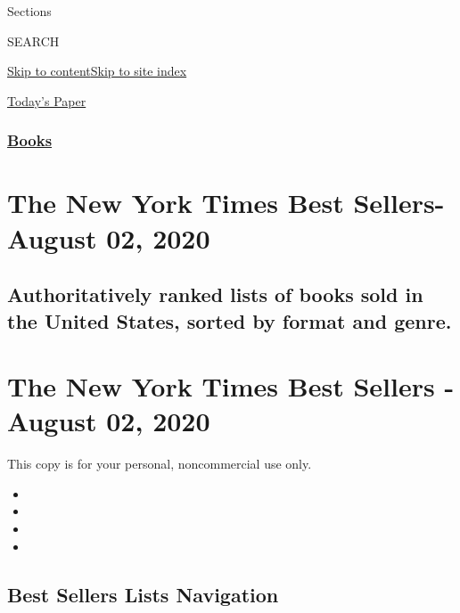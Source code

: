 Sections

SEARCH

\protect\hyperlink{site-content}{Skip to
content}\protect\hyperlink{site-index}{Skip to site index}

\href{https://myaccount.nytimes3xbfgragh.onion/auth/login?response_type=cookie\&client_id=vi}{}

\href{https://www.nytimes3xbfgragh.onion/section/todayspaper}{Today's
Paper}

\hypertarget{books}{%
\subsubsection{\texorpdfstring{\href{/section/books/}{Books}}{Books}}\label{books}}

\hypertarget{the-new-york-times-best-sellers--august-02-2020}{%
\section{The New York Times Best Sellers- August 02,
2020}\label{the-new-york-times-best-sellers--august-02-2020}}

\hypertarget{authoritatively-ranked-lists-of-books-sold-in-the-united-states-sorted-by-format-and-genre}{%
\subsection{Authoritatively ranked lists of books sold in the United
States, sorted by format and
genre.}\label{authoritatively-ranked-lists-of-books-sold-in-the-united-states-sorted-by-format-and-genre}}

\hypertarget{the-new-york-times-best-sellers---august-02-2020}{%
\section{The New York Times Best Sellers - August 02,
2020}\label{the-new-york-times-best-sellers---august-02-2020}}

This copy is for your personal, noncommercial use only.

\begin{itemize}
\item
\item
\item
\item
\end{itemize}

\hypertarget{best-sellers-lists-navigation}{%
\subsection{Best Sellers Lists
Navigation}\label{best-sellers-lists-navigation}}


